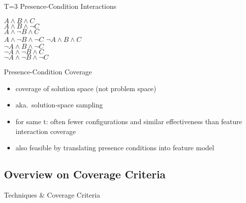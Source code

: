 \begin{frame}{\myframetitle{} }
\begin{mycolumns}[widths={48}]
\begin{example}{{T=3 Presence-Condition Interactions}}
			\begin{mycolumns}[animation=none]
				$A \wedge B \wedge C$\\
				$A \wedge B \wedge \neg C$\\
				$A \wedge \neg B \wedge C$\\
				$A \wedge \neg B \wedge \neg C$
			\mynextcolumn
				$\neg A \wedge B \wedge C$\\
				$\neg A \wedge B \wedge \neg C$\\
				$\neg A \wedge \neg B \wedge C$\\
				$\neg A \wedge \neg B \wedge \neg C$
			\end{mycolumns}
		\end{example}
		\pause
		\begin{note}{Presence-Condition Coverage\mysource{\krieterpresenceconditioncoverage}}
			\begin{itemize}
				\item coverage of solution space (not problem space)
				\item aka.\ solution-space sampling
				\item for same t: often fewer configurations and similar effectiveness than feature interaction coverage
				\item also feasible by translating presence conditions into feature model \mysource{\hentzesolutionspacesampling}
			\end{itemize}
		\end{note}
	\end{mycolumns}
\end{frame}

\subsection{Overview on Coverage Criteria}
\begin{frame}{\myframetitle{} }
	\begin{definition}{Techniques \& Coverage Criteria \mysource{\samplingsurvey}}
	\end{definition}
\end{frame}

